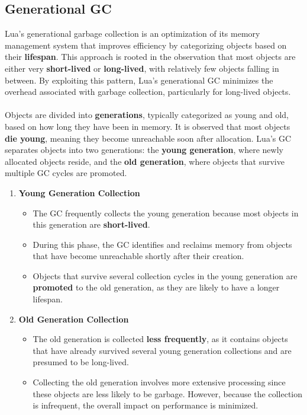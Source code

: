 \documentclass[11pt,paper=a4,answers]{exam}
\begin{document}
\subsection{Generational GC}
Lua's generational garbage collection is an optimization of its memory management system that improves efficiency by categorizing objects based on their \textbf{lifespan}. This approach is rooted in the observation that most objects are either very \textbf{short-lived} or \textbf{long-lived}, with relatively few objects falling in between. By exploiting this pattern, Lua's generational GC minimizes the overhead associated with garbage collection, particularly for long-lived objects.
\\ \\
Objects are divided into \textbf{generations}, typically categorized as young and old, based on how long they have been in memory. It is observed that most objects \textbf{die young}, meaning they become unreachable soon after allocation. Lua's GC separates objects into two generations: the \textbf{young generation}, where newly allocated objects reside, and the \textbf{old generation}, where objects that survive multiple GC cycles are promoted.

\begin{enumerate}
    \item \textbf{Young Generation Collection}
    \begin{itemize}
        \item The GC frequently collects the young generation because most objects in this generation are \textbf{short-lived}.
        \item During this phase, the GC identifies and reclaims memory from objects that have become unreachable shortly after their creation.
        \item Objects that survive several collection cycles in the young generation are \textbf{promoted} to the old generation, as they are likely to have a longer lifespan.
    \end{itemize}
    \item \textbf{Old Generation Collection}
    \begin{itemize}
        \item The old generation is collected \textbf{less frequently}, as it contains objects that have already survived several young generation collections and are presumed to be long-lived.
        \item Collecting the old generation involves more extensive processing since these objects are less likely to be garbage. However, because the collection is infrequent, the overall impact on performance is minimized.
    \end{itemize}
\end{enumerate}
\end{document}
